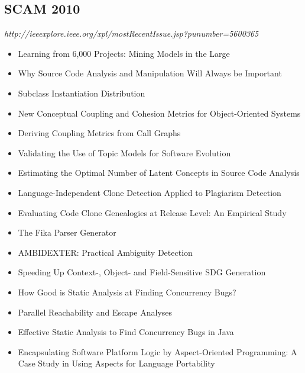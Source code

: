 \subsection{SCAM 2010}

{\small \em http://ieeexplore.ieee.org/xpl/mostRecentIssue.jsp?punumber=5600365}

{\small
\begin{itemize}[itemsep=-1ex]
  \item Learning from 6,000 Projects: Mining Models in the Large {\color{blue} \checkmark}{\color{red} \texttimes}
  \item Why Source Code Analysis and Manipulation Will Always be Important {\color{blue} \checkmark}{\color{red} \texttimes}
  \item Subclass Instantiation Distribution {\color{blue} \checkmark}{\color{red} \texttimes}
  \item New Conceptual Coupling and Cohesion Metrics for Object-Oriented Systems {\color{blue} \checkmark}{\color{red} \texttimes}
  \item Deriving Coupling Metrics from Call Graphs {\color{blue} \checkmark}{\color{red} \texttimes}
  \item Validating the Use of Topic Models for Software Evolution
  \item Estimating the Optimal Number of Latent Concepts in Source Code Analysis
  \item Language-Independent Clone Detection Applied to Plagiarism Detection
  \item Evaluating Code Clone Genealogies at Release Level: An Empirical Study
  \item The Fika Parser Generator
  \item AMBIDEXTER: Practical Ambiguity Detection
  \item Speeding Up Context-, Object- and Field-Sensitive SDG Generation {\color{blue} \checkmark}{\color{red} \texttimes}
  \item How Good is Static Analysis at Finding Concurrency Bugs? {\color{blue} \checkmark}{\color{red} \texttimes}
  \item Parallel Reachability and Escape Analyses {\color{blue} \checkmark}{\color{red} \texttimes}
  \item Effective Static Analysis to Find Concurrency Bugs in Java {\color{blue} \checkmark}{\color{blue} \checkmark}
  \item Encapsulating Software Platform Logic by Aspect-Oriented Programming: A Case Study in Using Aspects for Language Portability {\color{blue} \checkmark}{\color{red} \texttimes}

\end{itemize}}
